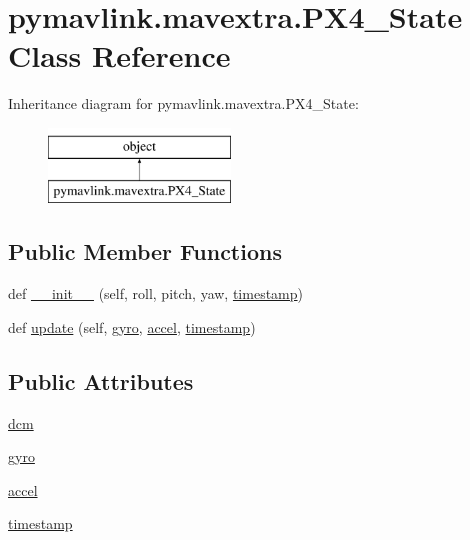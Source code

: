 \hypertarget{classpymavlink_1_1mavextra_1_1PX4__State}{}\section{pymavlink.\+mavextra.\+P\+X4\+\_\+\+State Class Reference}
\label{classpymavlink_1_1mavextra_1_1PX4__State}
Inheritance diagram for pymavlink.\+mavextra.\+P\+X4\+\_\+\+State\+:\begin{figure}[H]
\begin{center}
\leavevmode
\includegraphics[height=2.000000cm]{classpymavlink_1_1mavextra_1_1PX4__State}
\end{center}
\end{figure}
\subsection*{Public Member Functions}
\begin{DoxyCompactItemize}
\item 
def \mbox{\hyperlink{classpymavlink_1_1mavextra_1_1PX4__State_a18f7e046f1a106b2174974649f8ec4da}{\+\_\+\+\_\+init\+\_\+\+\_\+}} (self, roll, pitch, yaw, \mbox{\hyperlink{classpymavlink_1_1mavextra_1_1PX4__State_a6197e3a9dd12b294c85a5362cec42484}{timestamp}})
\item 
def \mbox{\hyperlink{classpymavlink_1_1mavextra_1_1PX4__State_a037948aa501815589cc75599fed81b34}{update}} (self, \mbox{\hyperlink{classpymavlink_1_1mavextra_1_1PX4__State_a4ef07e653fe7a41779192a631ce2f8f8}{gyro}}, \mbox{\hyperlink{classpymavlink_1_1mavextra_1_1PX4__State_a886dcbf09202e4d1a8ea8d8034b7a4de}{accel}}, \mbox{\hyperlink{classpymavlink_1_1mavextra_1_1PX4__State_a6197e3a9dd12b294c85a5362cec42484}{timestamp}})
\end{DoxyCompactItemize}
\subsection*{Public Attributes}
\begin{DoxyCompactItemize}
\item 
\mbox{\hyperlink{classpymavlink_1_1mavextra_1_1PX4__State_a434595eca65107e404a6debec708e3a6}{dcm}}
\item 
\mbox{\hyperlink{classpymavlink_1_1mavextra_1_1PX4__State_a4ef07e653fe7a41779192a631ce2f8f8}{gyro}}
\item 
\mbox{\hyperlink{classpymavlink_1_1mavextra_1_1PX4__State_a886dcbf09202e4d1a8ea8d8034b7a4de}{accel}}
\item 
\mbox{\hyperlink{classpymavlink_1_1mavextra_1_1PX4__State_a6197e3a9dd12b294c85a5362cec42484}{timestamp}}
\end{DoxyCompactItemize}


